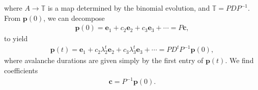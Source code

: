 \documentclass[superscriptaddress]{revtex4-1}
\begin{document}
where $A \rightarrow \mathbb{T}$ is a map determined by the binomial evolution, and $\mathbb{T} = PDP^{-1}$. From $\bm{p}(0)$, we can decompose
\begin{align*}
\bm{p}(0) = \bm{e}_1 + c_2\bm{e}_2 + c_3\bm{e}_3 + \dotsm = P\bm{c},
\end{align*}
to yield
\begin{align*}
\bm{p}(t) = \bm{e}_1 + c_2\lambda_2^t\bm{e}_2 + c_3\lambda_3^t\bm{e}_3 + \dotsm = PD^tP^{-1}\bm{p}(0),
\end{align*}
where avalanche durations are given simply by the first entry of $\bm{p}(t)$. We find coefficients
\begin{align*}
\bm{c} = P^{-1}\bm{p}(0). 
\end{align*}



	
\end{document}
